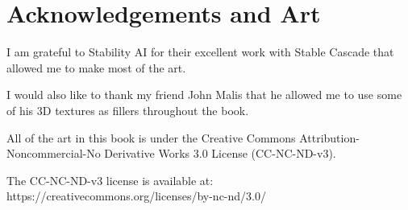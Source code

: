 \onecolumn
\chapter{Acknowledgements and Art}


\noindent I am grateful to Stability AI for their excellent work with Stable Cascade that allowed me to make most of the art.

\vspace{1em}

\noindent I would also like to thank my friend John Malis that he allowed me to use some of his 3D textures as fillers throughout the book.

\vspace{1em}

\noindent All of the art in this book is under the Creative Commons Attribution-Noncommercial-No Derivative Works 3.0 License (CC-NC-ND-v3).

\vspace{1em}

\noindent The CC-NC-ND-v3 license is available at: https://creativecommons.org/licenses/by-nc-nd/3.0/
